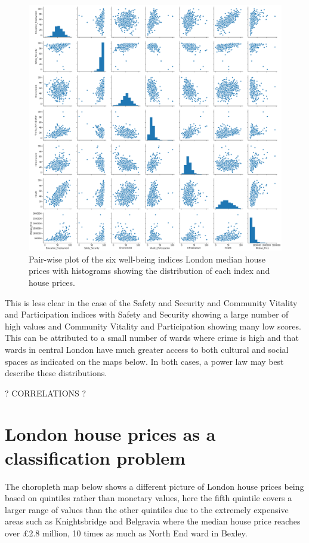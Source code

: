 \begin{figure}
\centering
\includegraphics[scale=0.3]{figures/pairplot}
\decoRule
\caption{Pair-wise plot of the six well-being indices London median house prices with histograms showing the distribution of each index and house prices.}
\end{figure}

This is less clear in the case of the Safety and Security and Community Vitality and Participation indices with Safety and Security showing a large number of high values and Community Vitality and Participation showing many low scores. This can be attributed to a small number of wards where crime is high and that wards in central London have much greater access to both cultural and social spaces as indicated on the maps below. In both cases, a power law may best describe these distributions.

? CORRELATIONS ?


\section{London house prices as a classification problem}
The choropleth map below shows a different picture of London house prices being based on quintiles rather than monetary values, here the fifth quintile covers a larger range of values than the other quintiles due to the extremely expensive areas such as Knightsbridge and Belgravia where the median house price reaches over £2.8 million, 10 times as much as North End ward in Bexley.

